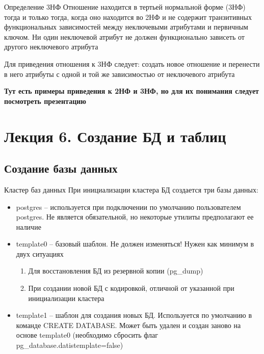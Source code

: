 \documentclass[12pt]{article}
\begin{document}
\begin{defin}{Определение 3НФ}
    Отношение находится в тертьей нормальной форме (3НФ) тогда и только тогда, когда оно находится во 2НФ и не содержит транзитивных функциональных зависимостей между неключевыми атрибутами и первичным ключом. Ни один неключевой атрибут не должен функционально зависеть от другого неключевого атрибута

    Для приведения отношения к 3НФ следует: создать новое отношение и перенести в него атрибуты с одной и той же зависимостью от неключевого атрибута 
\end{defin}

\textbf{Тут есть примеры приведения к 2НФ и 3НФ, но для их понимания следует посмотреть презентацию}

\newpage

\section{Лекция 6. Создание БД и таблиц}

\subsection{Создание базы данных}

\begin{nota}{Кластер баз данных}
    При инициализации кластера БД создается три базы данных:

    \begin{itemize}
        \item postgres -- используется при подключении по умолчанию пользователем postgres. Не является обязательной, но некоторые утилиты предполагают ее наличие 
        \item template0 -- базовый шаблон. Не должен изменяться! Нужен как минимум в двух ситуациях 
        
        \begin{enumerate}
            \item Для восстановления БД из резервной копии (pg\_dump)
            \item При создании новой БД с кодировкой, отличной от указанной при инициализации кластера
        \end{enumerate}
        
        \item template1 -- шаблон для создания новых БД. Используется по умолчанию в команде CREATE DATABASE. Может быть удален и создан заново на основе template0 (необходимо сбросить флаг pg\_database.datistemplate=false)
    \end{itemize}
\end{nota}
\end{document}
